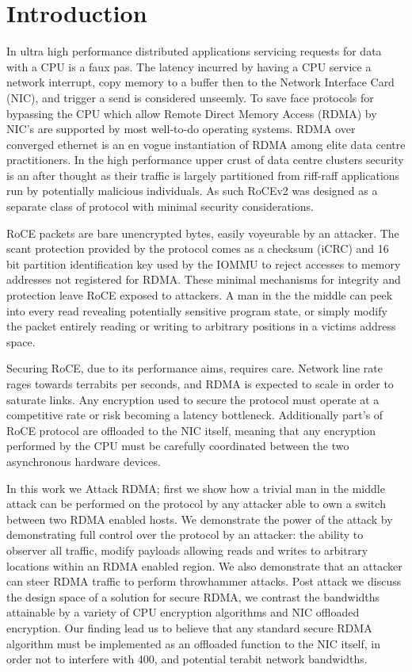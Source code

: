 
\section{Introduction}
\label{sec:intro}

In ultra high performance distributed applications servicing requests for data
with a CPU is a faux pas. The latency incurred by having a CPU
service a network interrupt, copy memory to a buffer then to the Network
Interface Card (NIC), and trigger a send is considered unseemly. To save face
protocols for bypassing the CPU which allow Remote Direct Memory Access (RDMA)
by NIC's are supported by most well-to-do operating systems. RDMA over
converged ethernet is an en vogue instantiation of RDMA among elite data centre
practitioners. In the high performance upper crust of data centre clusters
security is an after thought as their traffic is largely partitioned from
riff-raff applications run by potentially malicious individuals. As such RoCEv2
was designed as a separate class of protocol with minimal security considerations.

RoCE packets are bare unencrypted bytes, easily voyeurable by an attacker. The
scant protection provided by the protocol comes as a checksum (iCRC) and 16 bit
partition identification key used by the IOMMU to reject accesses to memory
addresses not registered for RDMA. These minimal mechanisms for integrity and
protection leave RoCE exposed to attackers. A man in the the middle can peek
into every read revealing potentially sensitive program state, or simply modify
the packet entirely reading or writing to arbitrary positions in a victims
address space.

Securing RoCE, due to its performance aims, requires care. Network line rate
rages towards terrabits per seconds, and RDMA is expected to scale in order to
saturate links. Any encryption used to secure the protocol must operate at a
competitive rate or risk becoming a latency bottleneck. Additionally part's of
RoCE protocol are offloaded to the NIC itself, meaning that any encryption
performed by the CPU must be carefully coordinated between the two
asynchronous hardware devices.

In this work we Attack RDMA; first we show how a trivial man in the middle
attack can be performed on the protocol by any attacker able to own a switch
between two RDMA enabled hosts. We demonstrate the power of the attack by
demonstrating full control over the protocol by an attacker: the ability to
observer all traffic, modify payloads allowing reads and writes to arbitrary
locations within an RDMA enabled region. We also demonstrate that an attacker
can steer RDMA traffic to perform throwhammer attacks. Post attack we discuss
the design space of a solution for secure RDMA, we contrast the bandwidths
attainable by a variety of CPU encryption algorithms and NIC offloaded
encryption. Our finding lead us to believe that any standard secure RDMA
algorithm must be implemented as an offloaded function to the NIC itself, in
order not to interfere with 400, and potential terabit network bandwidths. 

